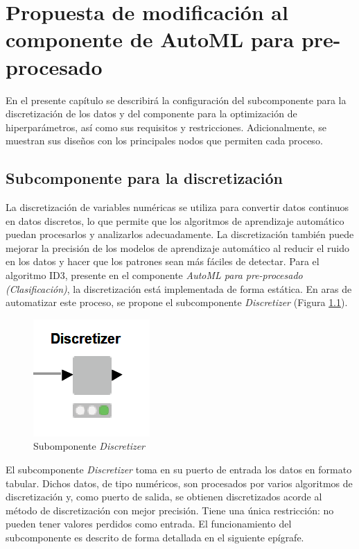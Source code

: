 \chapter{Propuesta de modificación al componente de AutoML para pre-procesado}\label{chap:2}
En el presente capítulo se describirá la configuración del subcomponente para la discretización de los datos y del componente para la optimización de hiperparámetros, así como sus requisitos y restricciones. Adicionalmente, se muestran sus diseños con los principales nodos que permiten cada proceso.


\section{Subcomponente para la discretización}
La discretización de variables numéricas se utiliza para convertir datos continuos en datos discretos, lo que permite que los algoritmos de aprendizaje automático puedan procesarlos y analizarlos adecuadamente. La discretización también puede mejorar la precisión de los modelos de aprendizaje automático al reducir el ruido en los datos y hacer que los patrones sean más fáciles de detectar. Para el algoritmo ID3, presente en el componente \textit{AutoML para pre-procesado (Clasificación)}, la discretización está implementada de forma estática. En aras de automatizar este proceso, se propone el subcomponente \textit{Discretizer} (Figura \ref{fig:subcomp-disc}).

\begin{figure}[H]
	\centering
	\includegraphics[width=0.15\linewidth]{"figuras/capi 2/subcomp-disc"}
	\caption[Subomponente Discretizer]{Subomponente \textit{Discretizer}}
	\label{fig:subcomp-disc}
\end{figure}

El subcomponente \textit{Discretizer} toma en su puerto de entrada los datos en formato tabular. Dichos datos, de tipo numéricos, son procesados por varios algoritmos de discretización y, como puerto de salida, se obtienen discretizados acorde al método de discretización con mejor precisión. Tiene una única restricción: no pueden tener valores perdidos como entrada. El funcionamiento del subcomponente es descrito de forma detallada en el siguiente epígrafe. 


